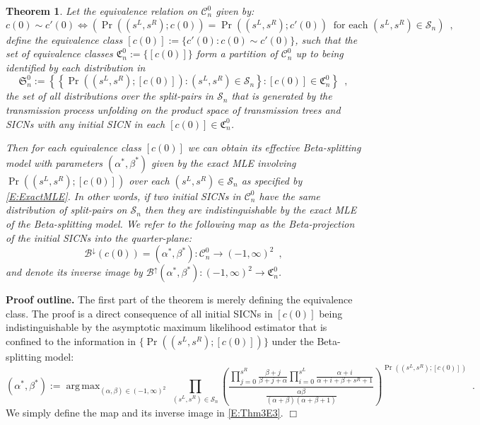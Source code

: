 \documentclass[review]{elsarticle}
\numberwithin{equation}{section}
\let\orgautoref\autoref
\renewcommand{\autoref}
        {\def\equationautorefname{Eq.}%
         \def\figureautorefname{Fig.}%
         \def\subfigureautorefname{Fig.}%
         \def\sectionautorefname{Sect.}%
         \def\subsectionautorefname{Sect.}%
         \def\subsubsectionautorefname{Sect.}%
         \def\Itemautorefname{item}%
         \def\tableautorefname{Table}%
         \def\propositionautorefname{Prop.}%
         \def\corollaryautorefname{Corollary}%
         \def\theoremautorefname{Theorem}%
         \def\remarkautorefname{Remark}%
         \def\lemmaautorefname{Lemma}%
         \def\proofofautorefname{Proof}%
         \def\exampleautorefname{Example}%
         \orgautoref}
\DeclareMathOperator*{\argmax}{arg\,max}
\newtheorem{theorem}{Theorem}%
\begin{document}
\begin{theorem}\label{T:effectiveBetaSplitting}
Let the equivalence relation on $\mathcal{C}_n^0$ given by: 
\begin{equation}\label{E:Thm3E1}
c(0) \sim c'(0) \iff \left(\Pr((s^L,s^R); c(0))=\Pr((s^L,s^R); c'(0)) \ \text{ for each } (s^L,s^R) \in \mathcal{S}_n \right) \enspace,
\end{equation}
define the equivalence class $[c(0)]:= \{c'(0) : c(0) \sim c'(0)\}$, such that 
the set of equivalence classes $\mathfrak{C}_n^0 := \{ [c(0)] \}$ form a partition of $\mathcal{C}_n^0$ up to being identified by each distribution in  
\begin{equation}\label{E:Thm3E2}
\mathfrak{S}_n^0 := \left\{ \left\{\Pr((s^L,s^R); [c(0)]) : (s^L,s^R) \in \mathcal{S}_n \right\} : [c(0)] \in \mathfrak{C}_n^0 \right\} \enspace,
\end{equation} 
the set of all distributions over the split-pairs in $\mathcal{S}_n$ that is generated by the transmission process unfolding on the product space of transmission trees and SICNs with any initial SICN in each $[c(0)]\in \mathfrak{C}_n^0$.

Then for each equivalence class $[c(0)]$ we can obtain its effective Beta-splitting model with 
parameters $(\alpha^*,\beta^*)$ given by the exact MLE involving $\Pr((s^L,s^R); [c(0)])$ over each $(s^L,s^R) \in \mathcal{S}_n$ as specified by \autoref{E:ExactMLE}.
In other words, if two initial SICNs in $\mathcal{C}_n^0$ have the same distribution of split-pairs on $\mathcal{S}_n$ then they are indistinguishable by the exact MLE of the Beta-splitting model.  
We refer to the following map as the {\em Beta-projection} of the initial SICNs into the quarter-plane:
\begin{equation}\label{E:Thm3E3}
\mathcal{B}^{\downarrow}(c(0)) = (\alpha^*,\beta^*): \mathcal{C}_n^0 \to (-1,\infty)^2\enspace,
\end{equation}
and denote its inverse image by $\mathcal{B}^{\uparrow}(\alpha^*,\beta^*) : (-1,\infty)^2 \to \mathfrak{C}_n^0$.
\end{theorem}

\smallskip
\noindent\textbf{Proof outline.} 
The first part of the theorem is merely defining the equivalence class.
The proof is a direct consequence of all initial SICNs in $[c(0)]$ being indistinguishable 
by the asymptotic maximum likelihood estimator 
that is confined to the information in $\{\Pr((s^L,s^R);[c(0)])\}$  
under the Beta-splitting model: 
\begin{equation}\label{E:ExactMLE}
(\alpha^*,\beta^*) := \argmax_{(\alpha,\beta) \in (-1,\infty)^2} \, 
\prod_{(s^L,s^R) \in \mathcal{S}_n} \left(\frac{\prod_{j=0}^{s^R}\frac{\beta+j}{\beta+j+\alpha} \prod_{i=0}^{s^L} \frac{\alpha+i}{\alpha+i+\beta+s^R+1}}
{\frac{\alpha \beta}{(\alpha+\beta)(\alpha+\beta+1)}}\right)^{\Pr((s^L,s^R);[c(0)])} \enspace.
\end{equation}
We simply define the map and its inverse image in \autoref{E:Thm3E3}.
\hfill $\Box$
\end{document}
